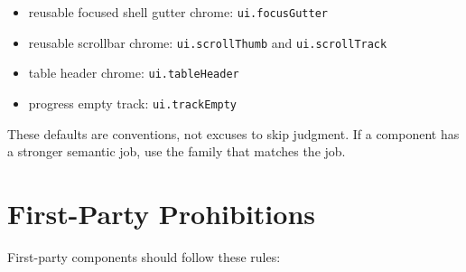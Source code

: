 \begin{itemize}
\item
  reusable focused shell gutter chrome: \texttt{u\allowbreak{}i\allowbreak{}.\allowbreak{}f\allowbreak{}o\allowbreak{}c\allowbreak{}u\allowbreak{}s\allowbreak{}G\allowbreak{}u\allowbreak{}t\allowbreak{}t\allowbreak{}e\allowbreak{}r}
\item
  reusable scrollbar chrome: \texttt{u\allowbreak{}i\allowbreak{}.\allowbreak{}s\allowbreak{}c\allowbreak{}r\allowbreak{}o\allowbreak{}l\allowbreak{}l\allowbreak{}T\allowbreak{}h\allowbreak{}u\allowbreak{}m\allowbreak{}b} and \texttt{u\allowbreak{}i\allowbreak{}.\allowbreak{}s\allowbreak{}c\allowbreak{}r\allowbreak{}o\allowbreak{}l\allowbreak{}l\allowbreak{}T\allowbreak{}r\allowbreak{}a\allowbreak{}c\allowbreak{}k}
\item
  table header chrome: \texttt{u\allowbreak{}i\allowbreak{}.\allowbreak{}t\allowbreak{}a\allowbreak{}b\allowbreak{}l\allowbreak{}e\allowbreak{}H\allowbreak{}e\allowbreak{}a\allowbreak{}d\allowbreak{}e\allowbreak{}r}
\item
  progress empty track: \texttt{u\allowbreak{}i\allowbreak{}.\allowbreak{}t\allowbreak{}r\allowbreak{}a\allowbreak{}c\allowbreak{}k\allowbreak{}E\allowbreak{}m\allowbreak{}p\allowbreak{}t\allowbreak{}y}
\end{itemize}

These defaults are conventions, not excuses to skip judgment. If a component has a stronger semantic job, use the family that matches the job.

\section{First-Party Prohibitions}\label{record-028-first-party-prohibitions}

First-party components should follow these rules:

